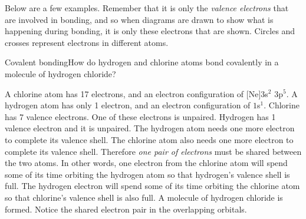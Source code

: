Below are a few examples. Remember that it is only the \textit{valence electrons} that are involved in bonding, and so when diagrams are drawn to show what is happening during bonding, it is only these electrons that are shown. Circles and crosses represent electrons in different atoms.\\
\vspace{-.3cm}
\begin{wex}{Covalent bonding}{How do hydrogen and chlorine atoms bond covalently in a molecule of hydrogen chloride?}{
A chlorine atom has 17 electrons, and an electron configuration of [Ne]$3$s$^{2}$ $3$p$^{5}$. A hydrogen atom has only 1 electron, and an electron configuration of $1$s$^{1}$.
Chlorine has 7 valence electrons. One of these electrons is unpaired. Hydrogen has 1 valence electron and it is unpaired.
The hydrogen atom needs one more electron to complete its valence shell. The chlorine atom also needs one more electron to complete its valence shell. Therefore \textit{one pair of electrons} must be shared between the two atoms. In other words, one electron from the chlorine atom will spend some of its time orbiting the hydrogen atom so that hydrogen's valence shell is full. The hydrogen electron will spend some of its time orbiting the chlorine atom so that chlorine's valence shell is also full. A molecule of hydrogen chloride is formed. Notice the shared electron pair in the overlapping orbitals.
\begin{figure}[H]
\begin{center}
\end{center}
\end{figure}}
\end{wex}
